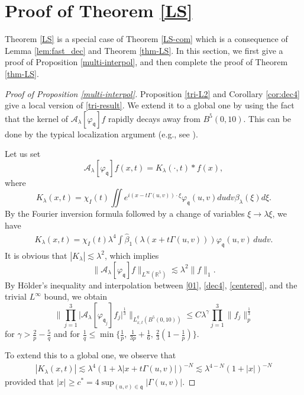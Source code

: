 \documentclass[10pt] %
{amsart}
\theoremstyle{plain}
\numberwithin{equation}{section}
\newcommand{\fq}{\mathfrak q}
\begin{document}
\section{Proof of Theorem \ref{LS}}\label{sec:completion}

Theorem \ref{LS} is a special case of Theorem \ref{LS-com} which is a consequence of Lemma \ref{lem:fast_dec} and Theorem \ref{thm-LS}. 
In this section, we first give a proof of Proposition \ref{multi-interpol}, and then complete the proof of Theorem \ref{thm-LS}.  




\begin{proof}[Proof of Proposition \ref{multi-interpol}]
Proposition \ref{tri-L2} and Corollary \ref{cor:dec4} give a local version of \eqref{tri-result}.
We extend it to a global one by using the fact that the kernel of $\mathcal A_\lambda[\varphi_\fq] f$ rapidly decays away from $B^5(0,10)$. 
This can be done by the typical localization argument (e.g., see \cite{HKL2, Lee1}).

Let us set 
\[
\mathcal A_\lambda  [\varphi_\fq] f(x,t) = K_\lambda (\cdot, t) \ast f (x),
\]
where 
\[
K_\lambda(x,t)= \chi_I(t)\iint e^{i (x - t\Gamma(u,v))\cdot \xi}  \varphi_\fq  ( u,v) du dv \beta_\lambda( \xi ) d\xi .
\]
By the Fourier inversion formula followed by a change of variables $\xi \rightarrow \lambda \xi$, we have
\begin{align}\label{kkk}
K_\lambda(x,t)=\chi_I(t)\lambda^4\int \widehat \beta_1(\lambda(x+t\Gamma(u,v)))\varphi_\fq(u,v)\,dudv.
\end{align}
It is obvious that $|K_\lambda|\lesssim \lambda^2$, which implies 
\begin{equation}\label{01}
\|  \mathcal A_\lambda [\varphi_{\fq }] f  \|_{L^\infty(\mathbb R^5)}
\lesssim \lambda^2  \|f \|_1 .
\end{equation}
By H\"older's inequality and interpolation between \eqref{01}, \eqref{dec4}, \eqref{centered}, and the trivial $L^\infty$ bound, we obtain 
\[
\Big\|\prod_{j=1}^3\big|\mathcal A_\lambda [\varphi_{\fq_j}]f_j \big|^{\frac13} \Big\|_{L_{x,t}^q (B^5(0,10))}
\le C  \lambda^{\gamma}\prod_{j=1}^3\|f_j \|_p^{\frac13} 
\]
for $\gamma > \frac 2 p -\frac 5 q$ and  for $\frac 1 q \le \min\{ \frac 1p,\, \frac 1{3p}+\frac16,\, \frac23(1-\frac1p)\}$.

 
To extend this to a global one,   we observe that
\begin{align}\label{ker2}
|K_\lambda(x,t)|
\lesssim
\lambda^4(1+\lambda|x+t\Gamma(u,v)|)^{-N}
\lesssim
\lambda^{4-N}(1+|x|)^{-N}
\end{align}
provided that $|x|\ge c^* =4 \sup_{(u,v)\in\fq}|\Gamma(u,v)|$.
 


\end{proof}
\end{document}
